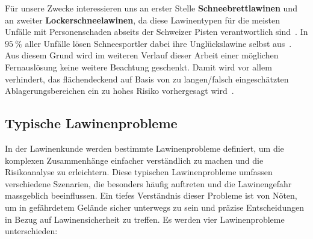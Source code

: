 Für unsere Zwecke interessieren uns an erster Stelle \textbf{Schneebrettlawinen} und an zweiter \textbf{Lockerschneelawinen}, da diese Lawinentypen für die meisten Unfälle mit Personenschaden abseits der Schweizer Pisten verantwortlich sind~\cite{harveyrhynerschweizerlawinenkunde}. In $\qty{95}{\percent}$ aller Unfälle lösen Schneesportler dabei ihre Unglückslawine selbst aus~\cite{ortovoxlabsnow}. Aus diesem Grund wird im weiteren Verlauf dieser Arbeit einer möglichen Fernauslösung keine weitere Beachtung geschenkt. Damit wird vor allem verhindert, das flächendeckend auf Basis von zu langen/falsch eingeschätzten Ablagerungsbereichen ein zu hohes Risiko vorhergesagt wird~\cite{athmaps}.

\subsection{Typische Lawinenprobleme}\label{lawinenprobleme}

In der Lawinenkunde werden bestimmte Lawinenprobleme definiert, um die komplexen Zusammenhänge einfacher verständlich zu machen und die Risikoanalyse zu erleichtern. Diese typischen Lawinenprobleme umfassen verschiedene Szenarien, die besonders häufig auftreten und die Lawinengefahr massgeblich beeinflussen. Ein tiefes Verständnis dieser Probleme ist von Nöten, um in gefährdetem Gelände sicher unterwegs zu sein und präzise Entscheidungen in Bezug auf Lawinensicherheit zu treffen. Es werden vier Lawinenprobleme unterschieden:

